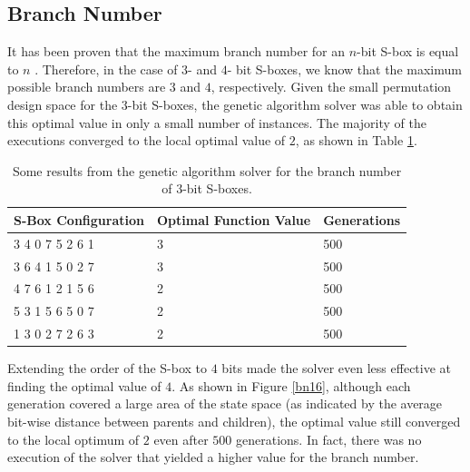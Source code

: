 \documentclass[11pt]{article}
\begin{document}
\subsection{Branch Number}


It has been proven that the maximum branch number for an $n$-bit S-box is equal to $n$ \cite{MaxBN}. Therefore, in the case of $3$- and $4$- bit S-boxes, we know that the maximum possible branch numbers are $3$ and $4$, respectively. Given the small permutation design space for the $3$-bit S-boxes, the genetic algorithm solver was able to obtain this optimal value in only a small number of instances. The majority of the executions converged to the local optimal value of $2$, as shown in Table \ref{bnTable}.

\begin{table}
	\centering
	\label{bnTable}
	\caption{Some results from the genetic algorithm solver for the branch number of $3$-bit S-boxes.}
    \begin{tabular}{|l|l|l|}
        \hline
        S-Box Configuration & Optimal Function Value & Generations \\ \hline
        3     4     0     7     5     2     6     1 & 3 & 500 \\ 
	3     6     4     1     5     0     2     7 & 3 & 500 \\ 
        4     7     6     1     2     1     5     6 & 2 & 500 \\ 
        5     3     1     5     6     5     0     7 & 2 & 500 \\ 
        1     3     0     2     7     2     6     3 & 2 & 500 \\ 
        \hline
    \end{tabular}
\end{table}

Extending the order of the S-box to $4$ bits made the solver even less effective at finding the optimal value of $4$. As shown in Figure \ref{bn16}, although each generation covered a large area of the state space (as indicated by the average bit-wise distance between parents and children), the optimal value still converged to the local optimum of $2$ even after $500$ generations. In fact, there was no execution of the solver that yielded a higher value for the branch number. 
\end{document}
